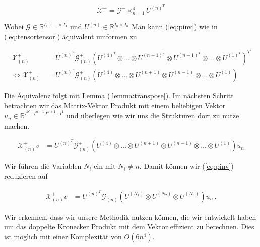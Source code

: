 \begin{equation} \label{eq:pinv}
\mathscr{X}^{+} = \mathscr{G}^{+} \times_{n=1}^{4} U^{ (n) ^{T} }
\end{equation}

Wobei $\mathscr{G} \in \mathbb{R}^{I_{1} \times \dots \times I_{4}}$ und $U^{(n)} \in \mathbb{R}^{I_{n} \times I_{n}}$
Man kann (\ref{eq:pinv}) wie in (\ref{eq:tensortensor}) äquivalent umformen zu

\begin{equation}
\begin{aligned}
\mathscr{X}^{+}_{(n)}  &= U^{ (n) ^{T} }  \mathscr{G}^{+}_{(n)} ( U^{ (4) ^{T} } \otimes \dots \otimes U^{ (n+1) ^{T} } \otimes U^{ (n-1) ^{T} } \otimes \dots \otimes U^{ (1) ^{T} })^{T} \\ \iff
\mathscr{X}^{+}_{(n)} &= U^{ (n) ^{T} }  \mathscr{G}^{+}_{(n)} ( U^{ (4)  } \otimes \dots \otimes U^{ (n+1) } \otimes U^{ (n-1) } \otimes \dots \otimes U^{ (1) })
\end{aligned}
\end{equation}

Die Äquivalenz folgt mit Lemma (\ref{lemma:transpose}).
Im nächsten Schritt betrachten wir das Matrix-Vektor Produkt mit einem beliebigen Vektor $u_n \in \mathbb{R}^{I^N \cdots I^{n-1} \, I^{n+1} \cdots I^1}$ und überlegen wie wir uns die Strukturen dort zu nutze machen.

\begin{equation} \label{eq:pinvv}
\begin{aligned}
\mathscr{X}^{+}_{(n)}v&= U^{ (n) ^{T} }  \mathscr{G}^{+}_{(n)} ( U^{ (4)  } \otimes \dots \otimes U^{ (n+1) } \otimes U^{ (n-1) } \otimes \dots \otimes U^{ (1) }) u_n
\end{aligned}
\end{equation}

Wir führen die Variablen $N_i$ ein mit $N_i \neq n$. Damit können wir (\ref{eq:pinv}) reduzieren auf

\begin{equation} \label{eq:pinvcase}
\begin{aligned}
\mathscr{X}^{+}_{(n)}v&= U^{ (n) ^{T} }  \mathscr{G}^{+}_{(n)} ( U^{ (N_{1})  } \otimes U^{ (N_{2})}  \otimes U^{ (N_{3}) }) u_n \,.
\end{aligned}
\end{equation}
 

Wir erkennen, dass wir unsere Methodik nutzen können, die wir entwickelt haben um das doppelte Kronecker Produkt mit dem Vektor effizient zu berechnen. 
Dies ist möglich mit einer Komplexität von $O(6n^4)$.

